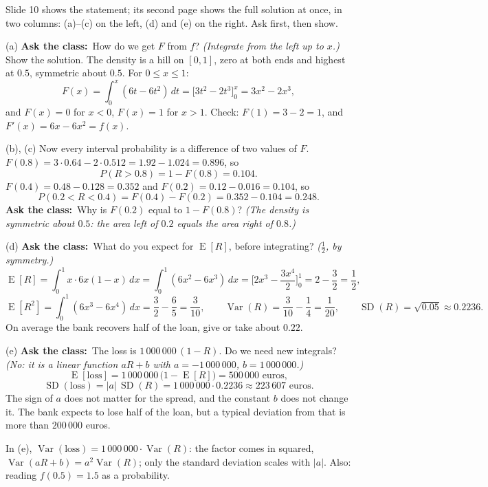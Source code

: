 \documentclass[11pt,a4paper,parskip=half]{scrartcl}
\newcommand{\E}{\operatorname{E}}
\newcommand{\Var}{\operatorname{Var}}
\newcommand{\SD}{\operatorname{SD}}
\newcommand{\ask}{\textbf{\color{navy}Ask the class:}\ }
\begin{document}
\begin{slidecue}
	Slide 10 shows the statement; its second page shows the full solution at
	once, in two columns: (a)--(c) on the left, (d) and (e) on the right.
	Ask first, then show.
\end{slidecue}

(a) \ask How do we get $F$ from $f$? \emph{(Integrate from the left up to
$x$.)} Show the solution. The density is a hill on $[0,1]$, zero at both
ends and highest at $0.5$, symmetric about $0.5$. For $0\le x\le1$:
\[ F(x)=\int_0^x(6t-6t^2)\,dt=\Big[3t^2-2t^3\Big]_0^x=3x^2-2x^3, \]
and $F(x)=0$ for $x<0$, $F(x)=1$ for $x>1$. Check: $F(1)=3-2=1$, and
$F'(x)=6x-6x^2=f(x)$.

(b), (c) Now every interval probability is a difference of two values of
$F$. $F(0.8)=3\cdot0.64-2\cdot0.512=1.92-1.024=0.896$, so
\[ P(R>0.8)=1-F(0.8)=0.104. \]
$F(0.4)=0.48-0.128=0.352$ and $F(0.2)=0.12-0.016=0.104$, so
\[ P(0.2<R<0.4)=F(0.4)-F(0.2)=0.352-0.104=0.248. \]
\ask Why is $F(0.2)$ equal to $1-F(0.8)$? \emph{(The density is symmetric
about $0.5$: the area left of $0.2$ equals the area right of $0.8$.)}

(d) \ask What do you expect for $\E[R]$, before integrating?
\emph{($\tfrac12$, by symmetry.)}
\[ \E[R]=\int_0^1x\cdot6x(1-x)\,dx=\int_0^1(6x^2-6x^3)\,dx
	=\Big[2x^3-\frac{3x^4}{2}\Big]_0^1=2-\frac32=\frac12, \]
\[ \E[R^2]=\int_0^1(6x^3-6x^4)\,dx=\frac32-\frac65=\frac3{10},\qquad
	\Var(R)=\frac3{10}-\frac14=\frac1{20},\qquad
	\SD(R)=\sqrt{0.05}\approx0.2236. \]
On average the bank recovers half of the loan, give or take about $0.22$.

(e) \ask The loss is $1\,000\,000\,(1-R)$. Do we need new integrals?
\emph{(No: it is a linear function $aR+b$ with $a=-1\,000\,000$,
$b=1\,000\,000$.)}
\[ \E[\text{loss}]=1\,000\,000\,\big(1-\E[R]\big)=500\,000\text{ euros}, \]
\[ \SD(\text{loss})=|a|\,\SD(R)=1\,000\,000\cdot0.2236\approx223\,607\text{ euros}. \]
The sign of $a$ does not matter for the spread, and the constant $b$ does
not change it. The bank expects to lose half of the loan, but a typical
deviation from that is more than $200\,000$ euros.

\begin{mistake}
	In (e), $\Var(\text{loss})=1\,000\,000\cdot\Var(R)$: the factor comes in
	squared, $\Var(aR+b)=a^2\Var(R)$; only the standard deviation scales
	with $|a|$. Also: reading $f(0.5)=1.5$ as a probability.
\end{mistake}
\end{document}
